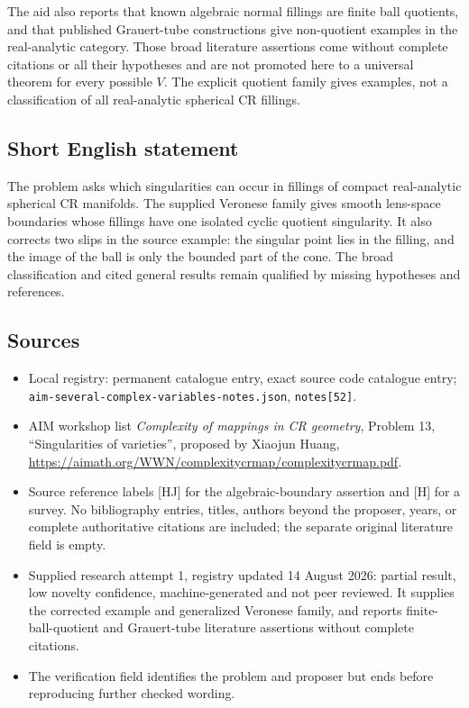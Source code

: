 \documentclass[11pt]{article}
\begin{document}
The aid also reports that known algebraic normal fillings are finite ball quotients, and that published Grauert-tube constructions give non-quotient examples in the real-analytic category. Those broad literature assertions come without complete citations or all their hypotheses and are not promoted here to a universal theorem for every possible $V$. The explicit quotient family gives examples, not a classification of all real-analytic spherical CR fillings.
\subsection{Short English statement}
The problem asks which singularities can occur in fillings of compact real-analytic spherical CR manifolds. The supplied Veronese family gives smooth lens-space boundaries whose fillings have one isolated cyclic quotient singularity. It also corrects two slips in the source example: the singular point lies in the filling, and the image of the ball is only the bounded part of the cone. The broad classification and cited general results remain qualified by missing hypotheses and references.
\subsection{Sources}
\begin{itemize}
\item Local registry: permanent catalogue entry, exact source code catalogue entry; \texttt{aim-several-complex-variables-notes.json}, \texttt{notes[52]}.
\item AIM workshop list \emph{Complexity of mappings in CR geometry}, Problem 13, ``Singularities of varieties'', proposed by Xiaojun Huang, \url{https://aimath.org/WWN/complexitycrmap/complexitycrmap.pdf}.
\item Source reference labels [HJ] for the algebraic-boundary assertion and [H] for a survey. No bibliography entries, titles, authors beyond the proposer, years, or complete authoritative citations are included; the separate original literature field is empty.
\item Supplied research attempt 1, registry updated 14 August 2026: partial result, low novelty confidence, machine-generated and not peer reviewed. It supplies the corrected example and generalized Veronese family, and reports finite-ball-quotient and Grauert-tube literature assertions without complete citations.
\item The verification field identifies the problem and proposer but ends before reproducing further checked wording.
\end{itemize}
\end{document}
